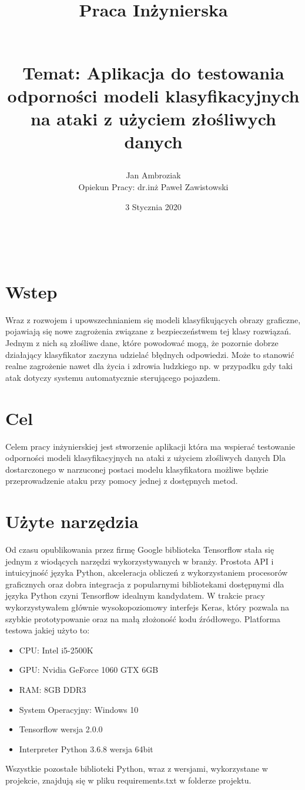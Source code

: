 \documentclass{article}
\title{
Praca Inżynierska
\begin{large}
\\Temat: Aplikacja do testowania odporności
modeli klasyfikacyjnych na ataki z użyciem złośliwych danych
\end{large}}
\date{3 Stycznia 2020}
\author{Jan Ambroziak \\ Opiekun Pracy: dr.inż Paweł Zawistowski}
\begin{document}
\maketitle

\

\section{Wstep}
Wraz z rozwojem i upowszechnianiem się modeli klasyfikujących obrazy graficzne,
pojawiają się nowe zagrożenia związane z bezpieczeństwem tej klasy rozwiązań.
Jednym z nich są złośliwe dane, które powodować mogą,
że pozornie dobrze działający klasyfikator zaczyna udzielać błędnych odpowiedzi.
Może to stanowić realne zagrożenie nawet dla życia i zdrowia ludzkiego
np. w przypadku gdy taki atak dotyczy systemu automatycznie sterującego pojazdem.

\section{Cel}
\label{sec:target}
Celem pracy inżynierskiej jest stworzenie aplikacji która ma wspierać testowanie
odporności modeli klasyfikacyjnych na ataki z użyciem złośliwych danych
Dla dostarczonego w narzuconej postaci modelu klasyfikatora możliwe będzie
przeprowadzenie ataku przy pomocy jednej z dostępnych metod.

\section{Użyte narzędzia}
Od czasu opublikowania przez firmę Google biblioteka Tensorflow 
stała się jednym z wiodących narzędzi wykorzystywanych w branży. Prostota API i intuicyjność
języka Python, akceleracja obliczeń z wykorzystaniem procesorów graficznych oraz dobra integracja z
popularnymi bibliotekami dostępnymi dla języka Python czyni Tensorflow idealnym kandydatem.
W trakcie pracy wykorzystywałem głównie wysokopoziomowy interfejs Keras, który pozwala na szybkie
prototypowanie oraz na małą złożoność kodu źródłowego.
Platforma testowa jakiej użyto to:
\begin{itemize}
    \item CPU: Intel i5-2500K
    \item GPU: Nvidia GeForce 1060 GTX 6GB
    \item RAM: 8GB DDR3
    \item System Operacyjny: Windows 10
    \item Tensorflow wersja 2.0.0
    \item Interpreter Python 3.6.8 wersja 64bit
\end{itemize}
Wszystkie pozostałe biblioteki Python, wraz z wersjami, wykorzystane w projekcie, znajdują się w pliku
requirements.txt w folderze projektu.
\end{document}
